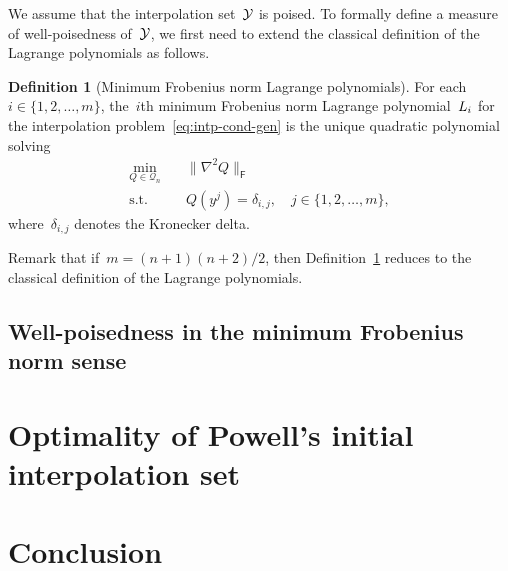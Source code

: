 \documentclass[draft]{article}
\numberwithin{equation}{section}
\theoremstyle{definition}
\newtheorem{definition}{Definition}[section]
\newcommand{\lagp}[1][]{L\ifblank{#1}{}{_{#1}}}
\newcommand{\norm}[2][]{#1\lVert#2#1\rVert}
\newcommand{\qpoly}{\mathcal{Q}_n}
\newcommand{\set}[2][]{#1\{#2#1\}}
\newcommand{\xpt}[1][]{\mathcal{Y}\ifblank{#1}{}{^{#1}}}
\begin{document}
We assume that the interpolation set~$\xpt$ is poised.
To formally define a measure of well-poisedness of~$\xpt$, we first need to extend the classical definition of the Lagrange polynomials as follows.

\begin{definition}[Minimum Frobenius norm Lagrange polynomials]
    \label{def:min-norm-lagp}
    For each~$i \in \set{1, 2, \dots, m}$, the~$i$th minimum Frobenius norm Lagrange polynomial~$\lagp[i]$ for the interpolation problem~\eqref{eq:intp-cond-gen} is the unique quadratic polynomial solving
    \begin{equation*}
        \begin{aligned}
            \min_{Q \in \qpoly} & \quad \norm{\nabla^2 Q}_{\mathsf{F}}\\
            \text{s.t.}         & \quad Q(y^j) = \delta_{i, j}, \quad j \in \set{1, 2, \dots, m},
        \end{aligned}
    \end{equation*}
    where~$\delta_{i, j}$ denotes the Kronecker delta.
\end{definition}

Remark that if~$m = (n + 1) (n + 2) / 2$, then Definition~\ref{def:min-norm-lagp} reduces to the classical definition of the Lagrange polynomials.

\subsection{Well-poisedness in the minimum Frobenius norm sense}

\section{Optimality of Powell's initial interpolation set}

\section{Conclusion}



\end{document}
